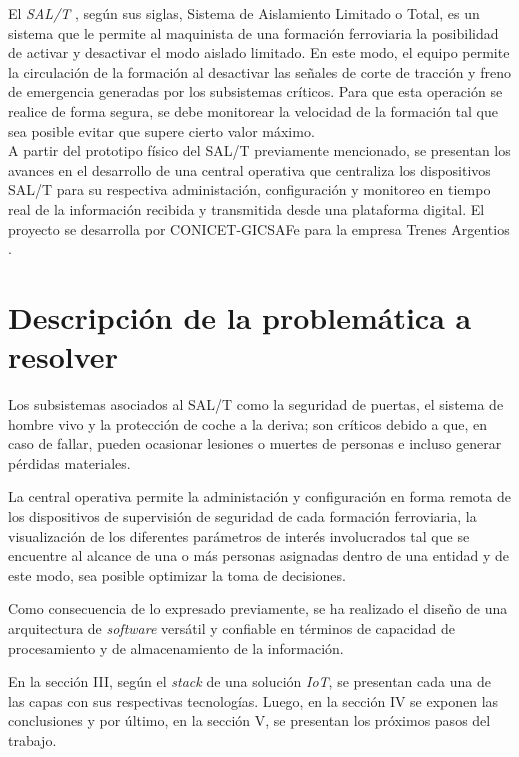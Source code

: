 \documentclass[a4paper]{IEEEtran}
\begin{document}
El \textit{SAL/T} \cite{b1}, según sus siglas, Sistema de Aislamiento Limitado o Total, es un sistema que le permite al maquinista de una formación ferroviaria la posibilidad de activar y desactivar el modo aislado limitado. En este modo, el equipo permite la circulación de la formación al desactivar las señales de corte de tracción y freno de emergencia generadas por los subsistemas críticos. Para que esta operación se realice de forma segura, se debe monitorear la velocidad de la formación tal que sea posible evitar que supere cierto valor máximo.\\

A partir del prototipo físico del SAL/T previamente mencionado, se presentan los avances en el desarrollo de una central operativa que centraliza los dispositivos SAL/T para su respectiva administación, configuración y monitoreo en tiempo real de la información recibida y transmitida desde una plataforma digital. El proyecto se desarrolla por CONICET-GICSAFe \cite{b2} para la empresa Trenes Argentios \cite{b3}. 


\section{Descripción de la problemática a resolver}

Los subsistemas asociados al SAL/T como la seguridad de puertas, el sistema de hombre vivo y la protección de coche a la deriva; son críticos debido a que, en caso de fallar, pueden ocasionar lesiones o muertes de personas e incluso generar pérdidas materiales. 

La central operativa permite la administación y configuración en forma remota de los dispositivos de supervisión de seguridad de cada formación ferroviaria, la visualización de los diferentes parámetros de interés involucrados tal que se encuentre al alcance de una o más personas asignadas dentro de una entidad y de este modo, sea posible optimizar la toma de decisiones.

Como consecuencia de lo expresado previamente, se ha realizado el diseño de una arquitectura de \textit{software} versátil y confiable en términos de capacidad de procesamiento y de almacenamiento de la información.

En la sección III, según el \textit{stack} \cite{b4} de una solución \textit{IoT}, se presentan cada una de las capas con sus respectivas tecnologías. Luego, en la sección IV se exponen las conclusiones y por último, en la sección V, se presentan los próximos pasos del trabajo.
\end{document}
